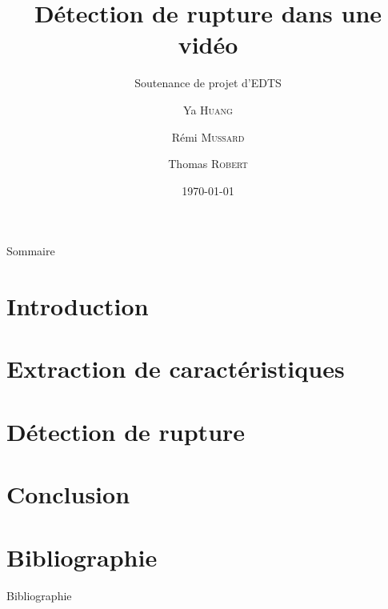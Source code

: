 \documentclass[compress,xcolor=table]{beamer}
\title{Détection de rupture dans une vidéo}
\subtitle{Soutenance de projet d'EDTS}
\date{\today}
\author{Ya \textsc{Huang} \and Rémi \textsc{Mussard} \and Thomas \textsc{Robert}}
\institute{Institut National des Sciences Appliquées de Rouen}
\begin{document}
\begin{frame}[plain]
	\titlepage
    \setcounter{framenumber}{0}
\end{frame}

\begin{frame}{Sommaire}
\begin{minipage}{\textwidth}
   \linespread{1.35}
	\tableofcontents[hideallsubsections]
\end{minipage}
\end{frame}

\section{Introduction}
\subsection{}


\section{Extraction de caractéristiques}
\subsection{}


\section{Détection de rupture}
\subsection{}


\section{Conclusion}
\subsection{}


\section{Bibliographie}
\begin{frame}[allowframebreaks]{Bibliographie}


 \end{frame}
\end{document}
